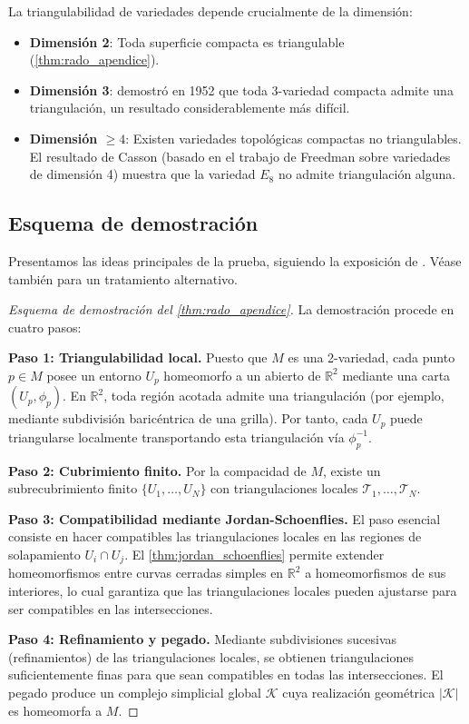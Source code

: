 \begin{remark}\label{rem:triangulabilidad_dimensiones}
La triangulabilidad de variedades depende crucialmente de la dimensión:
\begin{itemize}
	\item \textbf{Dimensión 2}: Toda superficie compacta es triangulable (\autoref{thm:rado_apendice}).
	\item \textbf{Dimensión 3}: \citet{moise1977geometric} demostró en 1952 que toda 3-variedad compacta admite una triangulación, un resultado considerablemente más difícil.
	\item \textbf{Dimensión $\geq 4$}: Existen variedades topológicas compactas no triangulables. El resultado de Casson (basado en el trabajo de Freedman sobre variedades de dimensión 4) muestra que la variedad $E_8$ no admite triangulación alguna.
\end{itemize}
\end{remark}

\subsection*{Esquema de demostración}

Presentamos las ideas principales de la prueba, siguiendo la exposición de \citet[Cap.~8]{moise1977geometric}. Véase también \citet[§77]{munkres2000topology} para un tratamiento alternativo.

\begin{proof}[Esquema de demostración del \autoref{thm:rado_apendice}]
La demostración procede en cuatro pasos:

\textbf{Paso 1: Triangulabilidad local.}
Puesto que $M$ es una 2-variedad, cada punto $p \in M$ posee un entorno $U_p$ homeomorfo a un abierto de $\mathbb{R}^2$ mediante una carta $(U_p, \phi_p)$. En $\mathbb{R}^2$, toda región acotada admite una triangulación (por ejemplo, mediante subdivisión baricéntrica de una grilla). Por tanto, cada $U_p$ puede triangularse localmente transportando esta triangulación vía $\phi_p^{-1}$.

\textbf{Paso 2: Cubrimiento finito.}
Por la compacidad de $M$, existe un subrecubrimiento finito $\{U_1, \ldots, U_N\}$ con triangulaciones locales $\mathcal{T}_1, \ldots, \mathcal{T}_N$.

\textbf{Paso 3: Compatibilidad mediante Jordan-Schoenflies.}
El paso esencial consiste en hacer compatibles las triangulaciones locales en las regiones de solapamiento $U_i \cap U_j$. El \autoref{thm:jordan_schoenflies} permite extender homeomorfismos entre curvas cerradas simples en $\mathbb{R}^2$ a homeomorfismos de sus interiores, lo cual garantiza que las triangulaciones locales pueden ajustarse para ser compatibles en las intersecciones.

\textbf{Paso 4: Refinamiento y pegado.}
Mediante subdivisiones sucesivas (refinamientos) de las triangulaciones locales, se obtienen triangulaciones suficientemente finas para que sean compatibles en todas las intersecciones. El pegado produce un complejo simplicial global $\mathcal{K}$ cuya realización geométrica $|\mathcal{K}|$ es homeomorfa a $M$.
\end{proof}

